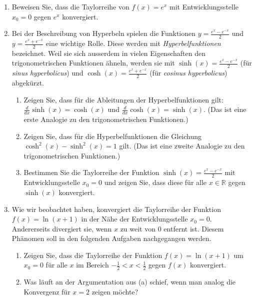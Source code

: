 \begin{ueb}
	{}{}
	\begin{enumerate}
		\item	Beweisen Sie, dass die Taylorreihe von $f(x)=e^x$ mit Entwicklungsstelle $x_0=0$ gegen $e^x$ konvergiert.

		\item Bei der Beschreibung von Hyperbeln spielen die Funktionen  $y= \frac{e^x - e^{-x}}{2}$ und $y= \frac{e^x + e^{-x}}{2}$ eine wichtige Rolle. Diese werden mit \emph{Hyperbelfunktionen} bezeichnet. Weil sie sich ausserdem in vielen Eigenschaften den trigonometrischen Funktionen ähneln, werden sie mit $\sinh(x) = \frac{e^x - e^{-x}}{2}$ (für \emph{sinus hyperbolicus}) und $\cosh(x)=\frac{e^x + e^{-x}}{2}$ (für \emph{cosinus hyperbolicus}) abgekürzt.
		      \begin{enumerate}
			      \item Zeigen Sie, dass für die Ableitungen der Hyperbelfunktionen gilt: \(\frac{d}{dx} \sinh(x) = \cosh(x)\) und \(\frac{d}{dx} \cosh(x) = \sinh(x)\). (Das ist eine erste Analogie zu den trigonometrischen Funktionen.)
			      \item Zeigen Sie, dass für die Hyperbelfunktionen die Gleichung \(\cosh^2(x) - \sinh^2(x) = 1\) gilt. (Das ist eine zweite Analogie zu den trigonometrischen Funktionen.)
			      \item         Bestimmen Sie die Taylorreihe der Funktion \(\sinh(x) = \frac{e^x - e^{-x}}{2}\) mit Entwicklungsstelle \(x_0 = 0\) und zeigen Sie, dass diese für alle \(x \in \mathbb{R}\) gegen \(\sinh(x)\) konvergiert.
		      \end{enumerate}


		\item Wie wir beobachtet haben, konvergiert die Taylorreihe der Funktion \(f(x) = \ln(x+1)\) in der Nähe der Entwicklungsstelle \(x_0 = 0\). Andererseits divergiert sie, wenn $x$ zu weit von $0$ entfernt ist. Diesem Phänomen soll in den folgenden Aufgaben nachgegangen werden.
		      \begin{enumerate}
			      \item Zeigen Sie, dass die Taylorreihe der Funktion \(f(x) = \ln(x+1)\) um $x_0 = 0$ für alle \(x\) im Bereich \(-\frac{1}{2} < x < \frac{1}{2}\) gegen \(f(x)\) konvergiert.
			      \item Was läuft an der Argumentation aus (a) schief, wenn man analog die Konvergenz für $x=2$ zeigen möchte?
		      \end{enumerate}


	\end{enumerate}
\end{ueb}
